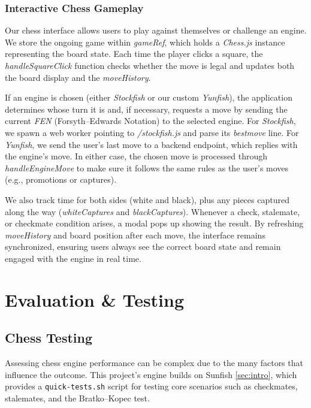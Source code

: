 \documentclass[12pt,a4paper]{article}
\begin{document}
\subsubsection{Interactive Chess Gameplay}

Our chess interface allows users to play against themselves or challenge 
an engine. We store the ongoing game within \emph{gameRef}, which holds a 
\emph{Chess.js} instance representing the board state. Each time the 
player clicks a square, the \emph{handleSquareClick} function checks 
whether the move is legal and updates both the board display and the 
\emph{moveHistory}. 

If an engine is chosen (either \emph{Stockfish} or our custom 
\emph{Yunfish}), the application determines whose turn it is and, if 
necessary, requests a move by sending the current \emph{FEN} (Forsyth–Edwards 
Notation) to the selected engine. For \emph{Stockfish}, we spawn a web 
worker pointing to \emph{/stockfish.js} and parse its \emph{bestmove} line. 
For \emph{Yunfish}, we send the user’s last move to a backend endpoint, 
which replies with the engine’s move. In either case, the chosen move is 
processed through \emph{handleEngineMove} to make sure it follows the 
same rules as the user’s moves (e.g., promotions or captures). 

We also track time for both sides (white and black), plus any pieces 
captured along the way (\emph{whiteCaptures} and \emph{blackCaptures}). 
Whenever a check, stalemate, or checkmate condition arises, a modal 
pops up showing the result. By refreshing \emph{moveHistory} and board 
position after each move, the interface remains synchronized, ensuring 
users always see the correct board state and remain engaged with the 
engine in real time.



\section{Evaluation \& Testing}
\subsection{Chess Testing}

Assessing chess engine performance can be complex due to the many factors that influence the outcome. This project’s engine builds on Sunfish \ref{sec:intro}, which provides a \texttt{quick-tests.sh} script for testing core scenarios such as checkmates, stalemates, and the Bratko--Kopec test.
\end{document}
